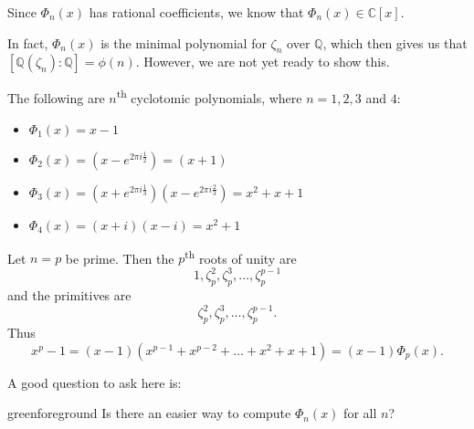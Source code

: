 \documentclass[notoc,notitlepage,nobib]{tufte-book}
\begin{document}
\begin{remark}
  Since $\Phi_n(x)$ has rational coefficients, we know that $\Phi_n(x) \in \mathbb{C}[x]$.
\end{remark}

In fact, $\Phi_n(x)$ is the minimal polynomial for $\zeta_n$ over $\mathbb{Q}$, which then
gives us that $[ \mathbb{Q}(\zeta_n) : \mathbb{Q} ] = \phi(n)$. However, we are not yet
ready to show this.

\begin{eg}
  The following are $n$\textsuperscript{th} cyclotomic polynomials, where $n = 1, 2, 3$
  and $4$:
  \begin{itemize}
    \item $\Phi_1(x) = x - 1$
    \item $\Phi_2(x) = \left(x - e^{2 \pi i \frac{1}{2}}\right) = (x + 1)$
    \item $\Phi_3(x) = \left(x + e^{2 \pi i \frac{1}{3}}\right)\left(x - e^{2 \pi i
      \frac{2}{3}}\right) =  x^2 + x + 1$
    \item $\Phi_4(x) = (x + i)(x - i) = x^2 + 1$
  \end{itemize}
\end{eg}

\begin{eg}
  Let $n = p$ be prime. Then the $p$\textsuperscript{th} roots of unity are
  \begin{equation*}
    1, \zeta_p^2, \zeta_p^3, \ldots, \zeta_p^{p - 1}
  \end{equation*}
  and the primitives are
  \begin{equation*}
    \zeta_p^2, \zeta_p^3, \ldots, \zeta_p^{p - 1}.
  \end{equation*}
  Thus
  \begin{equation*}
    x^p - 1 = (x - 1)(x^{p - 1} + x^{p - 2} + \hdots + x^2 + x + 1) = (x - 1) \Phi_p(x).
  \end{equation*}
\end{eg}

A good question to ask here is:

\begin{quotebox}{green}{foreground}
  Is there an easier way to compute $\Phi_n(x)$ for all $n$?
\end{quotebox}


\end{document}
